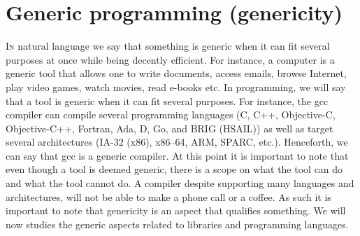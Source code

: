 \chapter{Generic programming (genericity)}
\label{chap:genericity}

\lettrine[lines=2]{I}{n} natural language we say that something is generic when it can fit several purposes at once
while being decently efficient. For instance, a computer is a generic tool that allows one to write documents, access
emails, browse Internet, play video games, watch movies, read e-books etc. In programming, we will say that a tool is
generic when it can fit several purposes. For instance, the gcc compiler can compile several programming languages (C,
C++, Objective-C, Objective-C++, Fortran, Ada, D, Go, and BRIG (HSAIL)) as well as target several architectures (IA-32
(x86), x86--64, ARM, SPARC, etc.). Henceforth, we can say that gcc is a generic compiler. At this point it is important
to note that even though a tool is deemed generic, there is a scope on what the tool can do and what the tool cannot do.
A compiler despite supporting many languages and architectures, will not be able to make a phone call or a coffee. As
such it is important to note that genericity is an aspect that qualifies something. We will now studies the generic
aspects related to libraries and programming languages.

